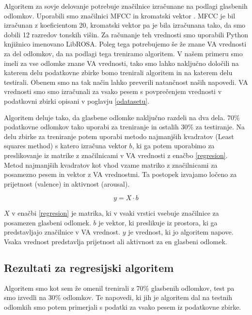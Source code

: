 \documentclass[a4paper, 12pt]{book}
\begin{document}
{Algoritem za sovje delovanje potrebuje značilnice izračunane na podlagi glasbenih odlomkov. Uporabili smo značilnici MFCC \cite{logan2000mel} in kromatski vektor \cite{bello2005robust}. MFCC je bil izračunan z koeficientom 20, kromatski vektor pa je bila izračunana tako, da smo dobili 12 razredov tonskih višin. Za računanje teh vrednosti smo uporabili Python knjižnico imenovano LibROSA. Poleg tega potrebujemo še že znane VA vrednosti za del odlomkov, da na podlagi tega treniramo algoritem. V našem primeru smo imeli za vse odlomke znane VA vrednosti, tako smo lahko naključno določili na katerem delu podatkovne zbirke bomo trenirali algoritem in na katerem delu testirali. Obenem smo na tak način lahko preverili natančnost naših napovedi. VA vrednosti smo smo izračunali za vsako pesem s povprečenjem vrednosti v podatkovni zbirki opisani v poglavju \ref{odatasetu}.

Algoritem deluje tako, da glasbene odlomke naključno razdeli na dva dela. 70\% podatkovne odlomkov tako uporabi za treniranje in ostalih 30\% za testiranje. Na delu zbirke za treniranje potem uporabi metodo najmanjših kvadratov (Least squares method) \cite{abdi2007method} s katero izračuna vektor $b$, ki ga potem uporabimo za preslikovanje iz matrike z značilnicami v VA vrednosti z enačbo \ref{regresion}. Metod najmanjših kvadratov kot vhod vzame matriko z značilnicami za posamezno pesem in vektor z VA vrednostmi. Ta postopek izvajamo ločeno za prijetnost (valence) in aktivnost (arousal).  

\begin{equation} 
\label{regresion}
y = X \cdot b
\end{equation} 

$X$ v enačbi \ref{regresion} je matrika, ki v vsaki vrstici vsebuje značilnice za posamezen glasbeni odlomek. $b$ je vektor, ki preslikuje iz prostora, ki ga predstavljajo značilnice v VA vrednost. $y$ je vrednost, ki jo algoritem napove. Vsaka vrednost predstavlja prijetnost ali aktivnost za en glasbeni odlomek. 

\subsection{Rezultati za regresijski algoritem}

Algoritem smo kot sem že omenil trenirali z 70\% glasbenih odlomkov, test pa smo izvedli na 30\% odlomkov. Te napovedi, ki jih je algoritem dal na testnih odlomkih smo potem primerjali s podatki za vsako pesem iz podatkovne zbirke.

}
\end{document}
